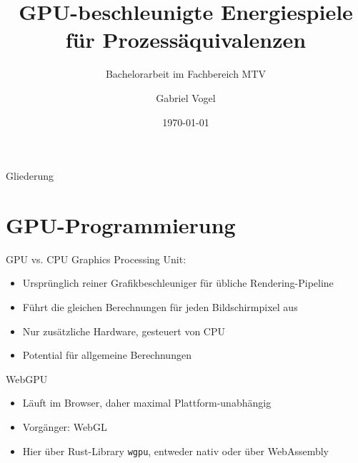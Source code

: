 \documentclass{beamer}
\title[]{GPU-beschleunigte Energiespiele für Prozessäquivalenzen}
\subtitle{Bachelorarbeit im Fachbereich MTV}
\author{Gabriel Vogel}
\date{\today}
\begin{document}
\begin{frame}
    \titlepage
\end{frame}

\begin{frame}{Gliederung}
    \tableofcontents
\end{frame}


\section{GPU-Programmierung}

\begin{frame}{GPU vs. CPU}
    Graphics Processing Unit:
    \begin{itemize}
        \item Ursprünglich reiner Grafikbeschleuniger für übliche
            Rendering-Pipeline
        \item Führt die gleichen Berechnungen für jeden Bildschirmpixel aus
        \item Nur zusätzliche Hardware, gesteuert von CPU
        \item Potential für allgemeine Berechnungen
    \end{itemize}
\end{frame}

\begin{frame}{WebGPU}
    \begin{itemize}
        \item Läuft im Browser, daher maximal Plattform-unabhängig
        \item Vorgänger: WebGL
        \item Hier über Rust-Library \texttt{wgpu},
            entweder nativ oder über WebAssembly
    \end{itemize}
\end{frame}
\end{document}
